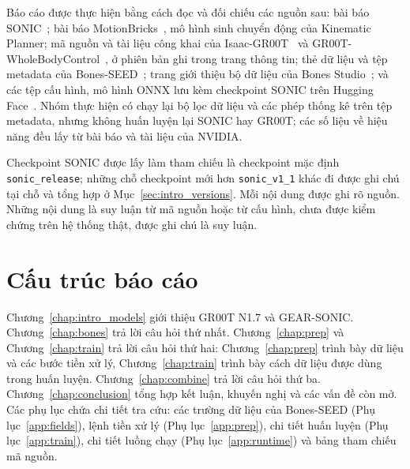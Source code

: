 \documentclass[12pt,a4paper,oneside]{report}
\newcommand{\code}[1]{\texttt{#1}}
\begin{document}
Báo cáo được thực hiện bằng cách đọc và đối chiếu các nguồn sau: bài báo SONIC~\cite{sonic}; bài báo MotionBricks~\cite{motionbricks}, mô hình sinh chuyển động của Kinematic Planner; mã nguồn và tài liệu công khai của Isaac-GR00T~\cite{isaacgr00t} và GR00T-WholeBodyControl~\cite{wbc}, ở phiên bản ghi trong trang thông tin; thẻ dữ liệu và tệp metadata của Bones-SEED~\cite{bonesseed}; trang giới thiệu bộ dữ liệu của Bones Studio~\cite{bonesweb}; và các tệp cấu hình, mô hình ONNX lưu kèm checkpoint SONIC trên Hugging Face~\cite{soniccard}. Nhóm thực hiện có chạy lại bộ lọc dữ liệu và các phép thống kê trên tệp metadata, nhưng không huấn luyện lại SONIC hay GR00T; các số liệu về hiệu năng đều lấy từ bài báo và tài liệu của NVIDIA.

Checkpoint SONIC được lấy làm tham chiếu là checkpoint mặc định \code{sonic\_release}; những chỗ checkpoint mới hơn \code{sonic\_v1\_1} khác đi được ghi chú tại chỗ và tổng hợp ở Mục~\ref{sec:intro_versions}. Mỗi nội dung được ghi rõ nguồn. Những nội dung là suy luận từ mã nguồn hoặc từ cấu hình, chưa được kiểm chứng trên hệ thống thật, được ghi chú là suy luận.

\section*{Cấu trúc báo cáo}

Chương~\ref{chap:intro_models} giới thiệu GR00T N1.7 và GEAR-SONIC. Chương~\ref{chap:bones} trả lời câu hỏi thứ nhất. Chương~\ref{chap:prep} và Chương~\ref{chap:train} trả lời câu hỏi thứ hai: Chương~\ref{chap:prep} trình bày dữ liệu và các bước tiền xử lý, Chương~\ref{chap:train} trình bày cách dữ liệu được dùng trong huấn luyện. Chương~\ref{chap:combine} trả lời câu hỏi thứ ba. Chương~\ref{chap:conclusion} tổng hợp kết luận, khuyến nghị và các vấn đề còn mở. Các phụ lục chứa chi tiết tra cứu: các trường dữ liệu của Bones-SEED (Phụ lục~\ref{app:fields}), lệnh tiền xử lý (Phụ lục~\ref{app:prep}), chi tiết huấn luyện (Phụ lục~\ref{app:train}), chi tiết luồng chạy (Phụ lục~\ref{app:runtime}) và bảng tham chiếu mã nguồn.
\clearpage

\setcounter{page}{1}

\end{document}
